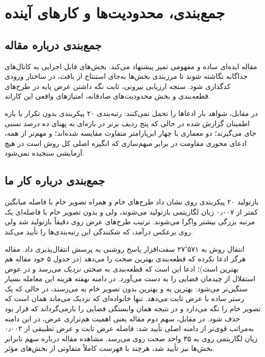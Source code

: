\section{جمع‌بندی، محدودیت‌ها و کار‌های آینده}
\label{sec:conclusion}

\subsection{جمع‌بندی درباره مقاله}
مقاله  ایده‌ای ساده و مفهومی تمیز پیشنهاد می‌کند: بخش‌های فایل اجرایی به کانال‌های جداگانه نگاشته شوند تا مرزبندی بخش‌ها به‌جای استنتاج از بافت، در ساختار ورودی کدگذاری شود. سنجه ارزیابی بیرونی، ثابت نگه داشتن عرض پایه در طرح‌های قطعه‌بندی و بخش محدودیت‌های صادقانه، امتیاز‌های واقعی این کار‌اند.

در مقابل، شواهد بار ادعا‌ها را تحمل نمی‌کنند: رتبه‌بندی ۲۰ پیکربندی بدون تکرار یا بازه اطمینان گزارش شده در حالی که پنج ردیف برتر در بازه‌ای به پهنای ده درصد نسبی جای می‌گیرند؛ دو معماری با چهار ابرپارامتر متفاوت مقایسه شده‌اند؛ و مهم‌تر از همه، ادعای محوری مقاومت در برابر مبهم‌سازی که انگیزه اصلی کل روش است در هیچ آزمایشی سنجیده نمی‌شود.

\subsection{جمع‌بندی درباره کار ما}
بازتولید ۲۰ پیکربندی روی  نشان داد طرح‌های خام و  همراه تصویر خام با فاصله میانگین کمتر از \num{۰٫۰۰۷} زیان لگاریتمی بازتولید می‌شوند، ولی  و  بدون تصویر خام با فاصله‌ای یک مرتبه بزرگی بیشتر واگرا می‌شوند. ترتیب طرح‌های عرض روی  دقیقاً بازتولید شد ولی روی  برعکس درآمد، که شکنندگی این رتبه‌بندی‌ها را تأیید می‌کند.

انتقال روش به \num{۲۷٬۵۷۱} سفت‌افزار  پاسخ روشنی به پرسش انتقال‌پذیری داد. مقاله هرگز ادعا نکرده که قطعه‌بندی بهترین صحت را می‌دهد (در جدول ۵ خود مقاله هم  بهترین است)؛ ادعا این است که قطعه‌بندی به صحتی \emph{نزدیک} می‌رسد و در عوض استقلال از چیدمان فضایی را به دست می‌آورد. در دامنه نهفته هزینه این معامله بسیار سنگین‌تر می‌شود: بهترین  به  و بهترین  بدون تصویر خام به  می‌رسند، در حالی که یک رستر ساده با عرض ثابت  می‌دهد. تنها خانواده‌ای که نزدیک می‌ماند همان است که تصویر خام را نگه می‌دارد و در نتیجه همان وابستگی فضایی را بازمی‌گرداند که قرار بود حذف شود. در مقابل، سهم دوم مقاله یعنی اهمیت هم‌ترازی عرض، در این دامنه به‌مراتب قوی‌تر از دامنه اصلی تأیید شد: فاصله عرض ثابت و عرض تطبیقی از \num{۰٫۰۰۲} زیان لگاریتمی روی  به ۳۵ واحد صحت روی  می‌رسد. مشاهده مقاله درباره سهم نابرابر بخش‌ها نیز تأیید شد، هرچند با فهرست کاملاً متفاوتی از بخش‌های مؤثر.

